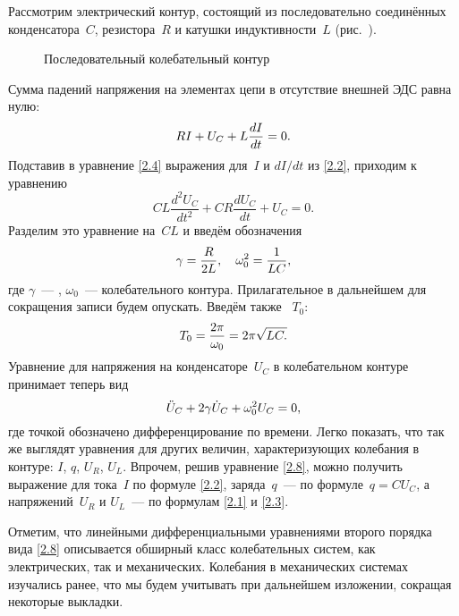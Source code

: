 \label{sec:free}

Рассмотрим электрический контур, состоящий из последовательно соединённых
конденсатора~$C$, резистора~$R$  и катушки индуктивности~$L$
(рис.~).

\begin{figure}[h!]
	\centering
	\caption{Последовательный колебательный контур}
\end{figure}

Сумма падений напряжения на элементах цепи в отсутствие внешней ЭДС равна нулю:
\begin{equation}
	\eqmark{2.4}
	RI+U_C+L\dfrac{dI}{dt}=0.
\end{equation}
Подставив в уравнение \eqref{2.4} выражения для~$I$ и $dI/dt$ из \eqref{2.2},
приходим к уравнению
\begin{equation*}
	CL\dfrac{d^2 U_{C} }{dt^2}+CR\dfrac{dU_C}{dt}+U_C=0.
\end{equation*}
Разделим это уравнение на~$CL$ и введём обозначения
\begin{equation}\eqmark{2.6}
\gamma=\dfrac{R}{2L},~~~\omega_0^2=\dfrac{1}{LC},
\end{equation}
где $\gamma$~--- ,
$\omega_0$~---  колебательного контура.
Прилагательное   в дальнейшем для сокращения записи будем 
опускать. Введём также  ~$T_0$:
\begin{equation}\eqmark{2.7}
T_0=\dfrac{2\pi}{\omega_0}=2\pi\sqrt{LC.}
\end{equation}
Уравнение для напряжения на конденсаторе~$U_C$ в колебательном контуре 
принимает теперь вид
\begin{equation}\eqmark{2.8}
\ddot{U}_C+2\gamma\dot{U}_C+\omega_0^2U_C=0,
\end{equation}
где точкой обозначено дифференцирование по времени. Легко показать, что так же
выглядят уравнения для других величин, характеризующих колебания в контуре:
$I$, $q$, $U_R$, $U_L$.
Впрочем, решив уравнение \eqref{2.8}, можно получить выражение для тока~$I$ по
формуле \eqref{2.2}, заряда~$q$~--- по формуле~$q=CU_C$, а напряжений~$U_R$ и
$U_L$~--- по формулам \eqref{2.1} и \eqref{2.3}.

Отметим, что линейными дифференциальными уравнениями второго порядка вида
\eqref{2.8} описывается обширный класс колебательных систем, как электрических,
так и механических. Колебания в механических системах изучались ранее,
что мы будем учитывать при дальнейшем изложении, сокращая некоторые выкладки.

